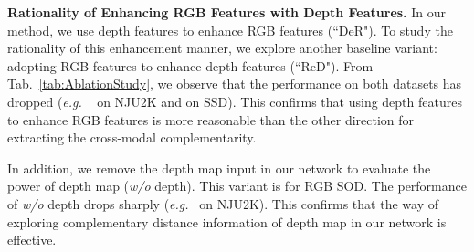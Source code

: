\documentclass[runningheads]{llncs}
\renewcommand{\tabcolsep}{.5mm}
\newcommand{\eg}{\emph{e.g.}}
\begin{document}
\noindent\textbf{Rationality of Enhancing RGB Features with Depth Features.}
In our method, we use depth features to enhance RGB features (``DeR").
To study the rationality of this enhancement manner,
we explore another baseline variant: adopting RGB features
to enhance depth features (``ReD").
From Tab.~\ref{tab:AblationStudy}, we observe that the performance on
both datasets has dropped (\eg
~ on NJU2K and
 on SSD).
This confirms that using depth features to enhance RGB features is more
reasonable than the other direction for extracting the cross-modal complementarity.


In addition, we remove the depth map input in our network to evaluate the power
of depth map (\textit{w/o} depth).
This variant is for RGB SOD.
The performance of \textit{w/o} depth drops sharply
(\eg~ on NJU2K).
This confirms that the way of exploring complementary distance information of depth map
in our network is effective.



\begin{table}[t!]
  \centering
\renewcommand{\arraystretch}{1.4}
  \renewcommand{\tabcolsep}{2mm}
  \caption{\small
  \textbf{Ablation studies on \textit{NJU2K}~\cite{Ju2014NJU2K} and \textit{SSD}~\cite{SSD2017}.}
    The best result of each column is \textbf{bold}.
Details are introduced in \S~\ref{sec:AblationStudy}.    
  }\label{tab:AblationStudy}
\end{table}
\end{document}
